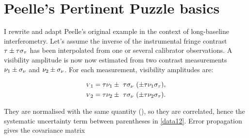 \documentclass{pasa}
\begin{document}
\section{Peelle's Pertinent Puzzle basics}
\label{sec:ppp}

I rewrite and adapt Peelle's original example in the context of long-baseline interferometry. Let's assume the inverse of the instrumental fringe contrast $\tau \pm \tau\sigma_\tau$ has been interpolated from one or several calibrator observations. A visibility amplitude is now now estimated from two contrast measurements $\nu_1 \pm \sigma_\nu$ and $\nu_2 \pm \sigma_\nu$.  For each measurement, visibility amplitudes are:

\begin{subequations}
\begin{align}
    {\scriptstyle V}_1 &= \tau\nu_1 \pm\ \tau\sigma_\nu\ (\pm \tau\nu_1\sigma_\tau),\\
    {\scriptstyle V}_2 &= \tau\nu_2 \pm\ \tau\sigma_\nu\ (\pm \tau\nu_2\sigma_\tau).
\end{align}
\label{eq:data12}
\end{subequations}

They are normalised with the same quantity (\cot), so they are correlated, hence the systematic uncertainty term between parentheses in \eqref{data12}. Error propagation gives the covariance matrix
\end{document}
